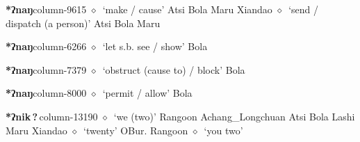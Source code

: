   \item {\footnotesize \textbf{*ʔnaŋ}}{\tiny column-9615}
         $\diamond$~`make / cause'
         Atsi 
\hspace{1ex}
         Bola 
\hspace{1ex}
         Maru 
\hspace{1ex}
         Xiandao 
\hspace{1ex}
         $\diamond$~`send / dispatch (a person)'
         Atsi 
\hspace{1ex}
         Bola 
\hspace{1ex}
         Maru 
  \item {\footnotesize \textbf{*ʔnaŋ}}{\tiny column-6266}
         $\diamond$~`let s.b. see / show'
         Bola 
  \item {\footnotesize \textbf{*ʔnaŋ}}{\tiny column-7379}
         $\diamond$~`obstruct (cause to) / block'
         Bola 
  \item {\footnotesize \textbf{*ʔnaŋ}}{\tiny column-8000}
         $\diamond$~`permit / allow'
         Bola 
  \item {\footnotesize \textbf{*ʔnik\,?\,}}{\tiny column-13190}
         $\diamond$~`we (two)'
         Rangoon 
\hspace{1ex}
         Achang\_Longchuan 
\hspace{1ex}
         Atsi 
\hspace{1ex}
         Bola 
\hspace{1ex}
         Lashi 
\hspace{1ex}
         Maru 
\hspace{1ex}
         Xiandao 
\hspace{1ex}
         $\diamond$~`twenty'
         OBur. 
\hspace{1ex}
         Rangoon 
\hspace{1ex}
         $\diamond$~`you two'
